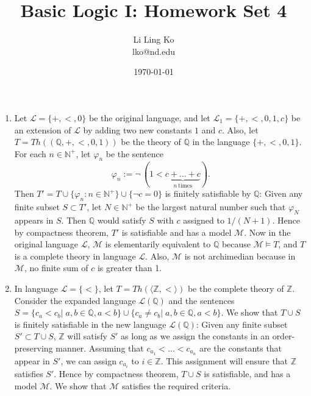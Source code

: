 \documentclass{article}
\begin{document}
\title{Basic Logic I: Homework Set 4}
\author{Li Ling Ko\\ lko@nd.edu}
\date{\today}
\maketitle

\begin{enumerate}
  \item Let $\mathcal{L}=\{+,<,0\}$ be the original language, and let
    $\mathcal{L}_1=\{+,<,0,1,c\}$ be an extension of $\mathcal{L}$ by
    adding two new constants $1$ and $c$. Also, let
    $T=Th((\mathbb{Q},+,<,0,1))$ be the theory of $\mathbb{Q}$ in the
    language $\{+,<,0,1\}$. For each $n\in\mathbb{N}^+$, let $\varphi_n$ be
    the sentence 
    \begin{equation*}
      \varphi_n := \neg\,(1 < \underbrace{c+\ldots+c}_{n\,\text{times}}).
    \end{equation*}
    Then $T'=T\cup\{\varphi_n:n\in\mathbb{N}^+\}\cup\{\neg c=0\}$ is
    finitely satisfiable by $\mathbb{Q}$: Given any finite subset $S\subset
    T'$, let $N\in\mathbb{N}^+$ be the largest natural number such that
    $\varphi_N$ appears in $S$. Then $\mathbb{Q}$ would satisfy $S$ with
    $c$ assigned to $1/(N+1)$. Hence by compactness theorem,
    $T'$ is satisfiable and has a model $\mathcal{M}$. Now in the original
    language $\mathcal{L}$, $\mathcal{M}$ is elementarily equivalent to
    $\mathbb{Q}$ because $\mathcal{M}\models T$, and $T$ is a complete
    theory in language $\mathcal{L}$. Also, $\mathcal{M}$ is not
    archimedian because in $\mathcal{M}$, no finite sum of $c$ is greater
    than 1.

  \item In language $\mathcal{L}=\{<\}$, let
    $T=Th(\langle\mathbb{Z},<\rangle)$ be the complete theory of
    $\mathbb{Z}$. Consider the expanded language $\mathcal{L}(\mathbb{Q})$
    and the sentences $S=\{c_a<c_b|\; a,b\in\mathbb{Q}, a<b\}\cup\{c_a\neq
    c_b|\; a,b\in\mathbb{Q}, a<b\}$. We show that $T\cup S$ is finitely
    satisfiable in the new language $\mathcal{L}(\mathbb{Q})$: Given any
    finite subset $S'\subset T\cup S$, $\mathbb{Z}$ will satisfy $S'$ as
    long as we assign the constants in an order-preserving manner. Assuming
    that $c_{a_1}<\ldots<c_{a_n}$ are the constants that appear in $S'$, we
    can assign $c_{a_i}$ to $i\in\mathbb{Z}$. This assignment will ensure
    that $\mathbb{Z}$ satisfies $S'$. Hence by compactness
    theorem, $T\cup S$ is satisfiable, and has a model $\mathcal{M}$. We
    show that $\mathcal{M}$ satisfies the required criteria. \\


\end{enumerate}
\end{document}
